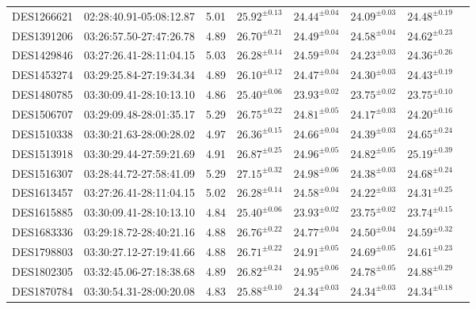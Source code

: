{\begin{ThreePartTable}
\begin{longtable}{lccccccl}
DES1266621 & 02:28:40.91-05:08:12.87 & 5.01 & $25.92^{ \pm 0.13}$ & $24.44^{ \pm 0.04}$ & $24.09^{ \pm 0.03}$ & $24.48^{ \pm 0.19}$ & \\
DES1391206 & 03:26:57.50-27:47:26.78 & 4.89 & $26.70^{ \pm 0.21}$ & $24.49^{ \pm 0.04}$ & $24.58^{ \pm 0.04}$ & $24.62^{ \pm 0.23}$ & \\
DES1429846 & 03:27:26.41-28:11:04.15 & 5.03 & $26.28^{ \pm 0.14}$ & $24.59^{ \pm 0.04}$ & $24.23^{ \pm 0.03}$ & $24.36^{ \pm 0.26}$ & \tnote{b} \\
DES1453274 & 03:29:25.84-27:19:34.34 & 4.89 & $26.10^{ \pm 0.12}$ & $24.47^{ \pm 0.04}$ & $24.30^{ \pm 0.03}$ & $24.43^{ \pm 0.19}$ &  \\
DES1480785 & 03:30:09.41-28:10:13.10 & 4.86 & $25.40^{ \pm 0.06}$ & $23.93^{ \pm 0.02}$ & $23.75^{ \pm 0.02}$ & $23.75^{ \pm 0.10}$ & \tnote{c} \\
DES1506707 & 03:29:09.48-28:01:35.17 & 5.29 & $26.75^{ \pm 0.22}$ & $24.81^{ \pm 0.05}$ & $24.17^{ \pm 0.03}$ & $24.20^{ \pm 0.16}$ & \\
DES1510338 & 03:30:21.63-28:00:28.02 & 4.97 & $26.36^{ \pm 0.15}$ & $24.66^{ \pm 0.04}$ & $24.39^{ \pm 0.03}$ & $24.65^{ \pm 0.24}$ & \\
DES1513918 & 03:30:29.44-27:59:21.69 & 4.91 & $26.87^{ \pm 0.25}$ & $24.96^{ \pm 0.05}$ & $24.82^{ \pm 0.05}$ & $25.19^{ \pm 0.39}$ & \tnote{d} \\
DES1516307 & 03:28:44.72-27:58:41.09 & 5.29 & $27.15^{ \pm 0.32}$ & $24.98^{ \pm 0.06}$ & $24.38^{ \pm 0.03}$ & $24.68^{ \pm 0.24}$ & \\
DES1613457 & 03:27:26.41-28:11:04.15 & 5.02 & $26.28^{ \pm 0.14}$ & $24.58^{ \pm 0.04}$ & $24.22^{ \pm 0.03}$ & $24.31^{ \pm 0.25}$ & \tnote{b} \\
DES1615885 & 03:30:09.41-28:10:13.10 & 4.84 & $25.40^{ \pm 0.06}$ & $23.93^{ \pm 0.02}$ & $23.75^{ \pm 0.02}$ & $23.74^{ \pm 0.15}$ & \tnote{c} \\
DES1683336 & 03:29:18.72-28:40:21.16 & 4.88 & $26.76^{ \pm 0.22}$ & $24.77^{ \pm 0.04}$ & $24.50^{ \pm 0.04}$ & $24.59^{ \pm 0.32}$ & \\
DES1798803 & 03:30:27.12-27:19:41.66 & 4.88 & $26.71^{ \pm 0.22}$ & $24.91^{ \pm 0.05}$ & $24.69^{ \pm 0.05}$ & $24.61^{ \pm 0.23}$ & \\
DES1802305 & 03:32:45.06-27:18:38.68 & 4.89 & $26.82^{ \pm 0.24}$ & $24.95^{ \pm 0.06}$ & $24.78^{ \pm 0.05}$ & $24.88^{ \pm 0.29}$ & \\
DES1870784 & 03:30:54.31-28:00:20.08 & 4.83 & $25.88^{ \pm 0.10}$ & $24.34^{ \pm 0.03}$ & $24.34^{ \pm 0.03}$ & $24.34^{ \pm 0.18}$ & \\

\end{longtable}
\end{ThreePartTable}}
